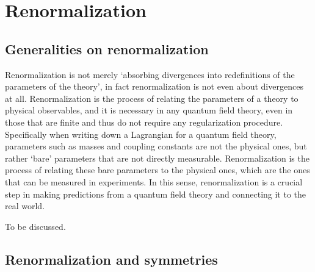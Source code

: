 \documentclass[../QFT_main.tex]{subfiles}
\begin{document}
\chapter{Renormalization}\label{ch:renormalization}



\section{Generalities on renormalization}


\begin{mytheorem}
Renormalization is not merely `absorbing divergences into redefinitions of the parameters of the theory', in fact renormalization is not even about divergences at all.
Renormalization is the process of relating the parameters of a theory to physical observables, and it is necessary in any quantum field theory, even in those that are finite and thus do not require any regularization procedure.
Specifically when writing down a Lagrangian for a quantum field theory, parameters such as masses and coupling constants are not the physical ones, but rather `bare' parameters that are not directly measurable.
Renormalization is the process of relating these bare parameters to the physical ones, which are the ones that can be measured in experiments.
In this sense, renormalization is a crucial step in making predictions from a quantum field theory and connecting it to the real world.
\end{mytheorem}




\begin{mytheorem}
To be discussed.
\end{mytheorem}



\section{Renormalization and symmetries}
\end{document}
